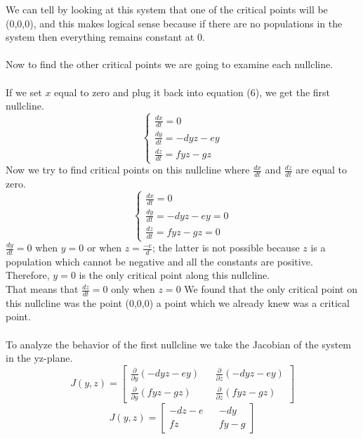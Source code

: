 \documentclass[11pt,oneside]{article}
\begin{document}
	We can tell by looking at this system that one of the critical points will be (0,0,0), and this makes logical sense because if there are no populations in the system then everything remains constant at 0.\\\\
	Now to find the other critical points we are going to examine each nullcline.\\\\
	If we set $x$ equal to zero and plug it back into equation (6), we get the first nullcline.
	\begin{equation}
	\begin{cases}
	\frac{dx}{dt} = 0\\
	\frac{dy}{dt} = -dyz - ey\\
	\frac{dz}{dt} = fyz - gz
	\end{cases}
	\end{equation}
	Now we try to find critical points on this nullcline where $\frac{dx}{dt}$ and $\frac{dz}{dt}$ are equal to zero.
	\begin{equation}
	\begin{cases}
	\frac{dx}{dt} = 0\\
	\frac{dy}{dt} = -dyz - ey = 0\\
	\frac{dz}{dt} = fyz - gz = 0
	\end{cases}
	\end{equation}
	$\frac{dy}{dt} = 0$ when $y = 0$ or when $z = \frac{-e}{d}$; the latter is not possible because $z$ is a population which cannot be negative and all the constants are positive. Therefore, $y = 0$ is the only critical point along this nullcline.\\
	That means that $\frac{dz}{dt} = 0$ only when $z = 0$
	We found that the only critical point on this nullcline was the point (0,0,0) a point which we already knew was a critical point.\\\\
	To analyze the behavior of the first nullcline we take the Jacobian of the system in the yz-plane.
	\begin{equation}
	J(y,z) = 
	\begin{bmatrix}
	\frac{\partial}{\partial y}(-dyz - ey) && \frac{\partial}{\partial z}(-dyz - ey) \\
	\frac{\partial}{\partial y}(fyz - gz) && \frac{\partial}{\partial z}(fyz - gz)
	\end{bmatrix}
	\end{equation}	
	\begin{equation}
	J(y,z) = 
	\begin{bmatrix}
	-dz - e && -dy \\
	fz && fy-g
	\end{bmatrix}
	\end{equation}
	
\end{document}
